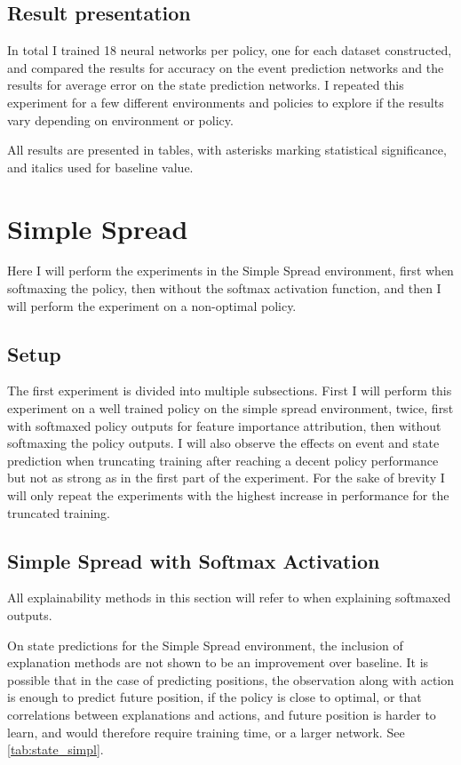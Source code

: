 \documentclass[UKenglish]{uiomasterthesis}
\begin{document}
\subsection{Result presentation}
In total I trained 18 neural networks per policy, one for each dataset constructed, and compared the results for accuracy on the event prediction networks and the results for average error on the state prediction networks. I repeated this experiment for a few different environments and policies to explore if the results vary depending on environment or policy.

All results are presented in tables, with asterisks marking statistical significance, and italics used for baseline value.

\section{Simple Spread}
\label{sec:exp_simpl}
Here I will perform the experiments in the Simple Spread environment, first when softmaxing the policy, then without the softmax activation function, and then I will perform the experiment on a non-optimal policy.

\subsection{Setup}
The first experiment is divided into multiple subsections. First I will perform this experiment on a well trained policy on the simple spread environment, twice, first with softmaxed policy outputs for feature importance attribution, then without softmaxing the policy outputs. I will also observe the effects on event and state prediction when truncating training after reaching a decent policy performance but not as strong as in the first part of the experiment. For the sake of brevity I will only repeat the experiments with the highest increase in performance for the truncated training.

\subsection{Simple Spread with Softmax Activation}
All explainability methods in this section will refer to when explaining softmaxed outputs.


On state predictions for the Simple Spread environment, the inclusion of explanation methods are not shown to be an improvement over baseline. It is possible that in the case of predicting positions, the observation along with action is enough to predict future position, if the policy is close to optimal, or that correlations between explanations and actions, and future position is harder to learn, and would therefore require training time, or a larger network. See \cref{tab:state_simpl}. 
\end{document}
